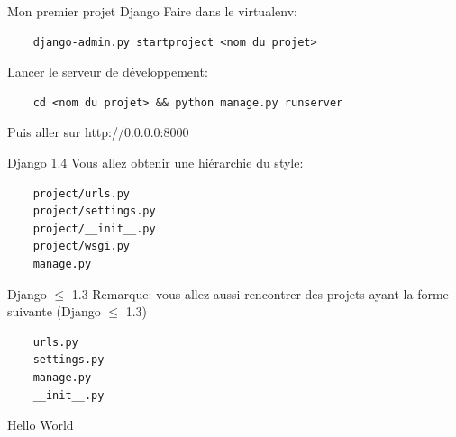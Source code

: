 \documentclass{beamer}
\begin{document}
\begin{frame}[fragile]{Mon premier projet Django}
    Faire dans le virtualenv:
            \begin{verbatim}
    django-admin.py startproject <nom du projet>
            \end{verbatim}
    \pause
    Lancer le serveur de développement:
    \begin{verbatim}
    cd <nom du projet> && python manage.py runserver
    \end{verbatim}
    Puis aller sur http://0.0.0.0:8000
\end{frame}

\begin{frame}[fragile]{Django 1.4}
    Vous allez obtenir une hiérarchie du style:

\begin{verbatim}
    project/urls.py
    project/settings.py
    project/__init__.py
    project/wsgi.py
    manage.py
\end{verbatim}

\end{frame}

\begin{frame}[fragile]{Django $\leq$ 1.3}
    Remarque: vous allez aussi rencontrer des projets ayant la forme suivante (Django $\leq$ 1.3)
    \begin{verbatim}
    urls.py
    settings.py
    manage.py
    __init__.py
    \end{verbatim}
\end{frame}

\begin{frame}[fragile]{}
\begin{LARGE}
\begin{center}
Hello World
\end{center}
\end{LARGE}
\end{frame}
\end{document}
